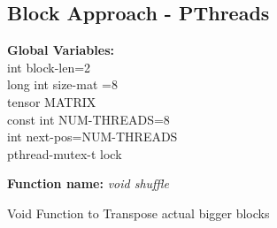 \documentclass[10pt,journal]{article}
\begin{document}
\subsection{Block Approach - PThreads}
\textbf{Global Variables:} \\
int block-len=2\\
long int size-mat =8\\
tensor MATRIX\\
const int NUM-THREADS=8\\
int next-pos=NUM-THREADS\\
pthread-mutex-t lock\\

\begin{algorithm}[H]
\SetAlgoLined
\textbf{Function name:} \emph{void shuffle}\\

\vspace{10pt} 
\caption{Void Function to Transpose actual bigger blocks}
\end{algorithm}
\end{document}
